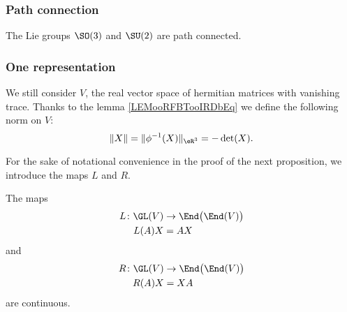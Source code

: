 \subsubsection{Path connection}

\begin{proposition}     \label{PROPooLEKXooSXPhRX}
    The Lie groups \( \SO(3)\) and \( \SU(2)\) are path connected.
\end{proposition}

\subsubsection{One representation}

We still consider \( V\), the real vector space of hermitian matrices with vanishing trace. Thanks to the lemma \ref{LEMooRFBTooIRDbEq} we define the following norm on \( V\):
\begin{equation}
    \| X \|=\| \phi^{-1}(X) \|_{\eR^3}=-\det(X).
\end{equation}

For the sake of notational convenience in the proof of the next proposition, we introduce the maps \( L\) and \( R\).
\begin{lemma}       \label{LEMooQVYXooQFNaGc}
    The maps
    \begin{equation}
        \begin{aligned}
            L\colon \GL(V)&\to \End\big( \End(V) \big) \\
            L(A)X&=AX
        \end{aligned}
    \end{equation}
    and
    \begin{equation}
        \begin{aligned}
            R\colon \GL(V)&\to \End\big( \End(V) \big) \\
            R(A)X&=XA
        \end{aligned}
    \end{equation}
    are continuous.
\end{lemma}

